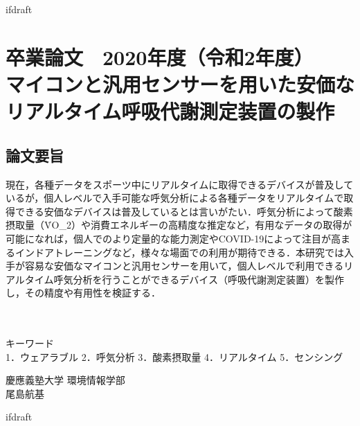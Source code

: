 \expandafter\ifx\csname ifdraft\endcsname\relax
 
\fi

\section*{卒業論文　2020年度（令和2年度）\\
\vspace{1em}
マイコンと汎用センサーを用いた安価な\\リアルタイム呼吸代謝測定装置の製作
}
\subsection*{論文要旨}
\noindent %

現在，各種データをスポーツ中にリアルタイムに取得できるデバイスが普及しているが，個人レベルで入手可能な呼気分析による各種データをリアルタイムで取得できる安価なデバイスは普及しているとは言いがたい．呼気分析によって酸素摂取量（\.{V}O_2）や消費エネルギーの高精度な推定など，有用なデータの取得が可能になれば，個人でのより定量的な能力測定やCOVID-19によって注目が高まるインドアトレーニングなど，様々な場面での利用が期待できる．本研究では入手が容易な安価なマイコンと汎用センサーを用いて，個人レベルで利用できるリアルタイム呼気分析を行うことができるデバイス（呼吸代謝測定装置）を製作し，その精度や有用性を検証する．

\\
\\
キーワード\\
1．ウェアラブル 2．呼気分析 3．酸素摂取量 4．リアルタイム 5．センシング\\
\begin{flushright} %
  慶應義塾大学 環境情報学部\\
  尾島航基
\end{flushright}

\expandafter\ifx\csname ifdraft\endcsname\relax
  
\fi
